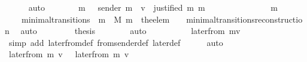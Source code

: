 \begin{isabellebody}
\ \ \ \ \isamarkupfalse%
\ auto\isanewline
\ \ \isamarkupfalse%
\ \isamarkupfalse%
\ {\isachardoublequoteopen}{\isasymdots}\ {\isacharequal}\ {\isacharbraceleft}m{\isacharprime}{\isacharprime}\ {\isasymin}\ {\isasymsigma}{\isacharprime}{\isachardot}\ sender\ m{\isacharprime}{\isacharprime}\ {\isacharequal}\ v\ {\isasymand}\ justified\ m\ m{\isacharprime}{\isacharprime}{\isacharbraceright}{\isachardoublequoteclose}\isanewline
\ \ \isamarkupfalse%
\ {\isacharminus}\isanewline
\ \ \ \ \isamarkupfalse%
\ {\isachardoublequoteopen}{\isasymsigma}{\isacharprime}\ {\isacharequal}\ \ {\isasymsigma}\ {\isasymunion}\ {\isacharbraceleft}m{\isacharprime}{\isacharbraceright}{\isachardoublequoteclose}\isanewline
\ \ \ \ \ \ \isamarkupfalse%
\ {\isacartoucheopen}{\isacharparenleft}{\isasymsigma}{\isacharcomma}\ {\isasymsigma}{\isacharprime}{\isacharparenright}\ {\isasymin}\ minimal{\isacharunderscore}transitions\ {\isasymand}\ m\ {\isasymin}\ M{\isacartoucheclose}\ {\isacartoucheopen}m{\isacharprime}\ {\isacharequal}\ the{\isacharunderscore}elem\ {\isacharparenleft}{\isasymsigma}{\isacharprime}\ {\isacharminus}\ {\isasymsigma}{\isacharparenright}{\isacartoucheclose}\ minimal{\isacharunderscore}transitions{\isacharunderscore}reconstruction\ \isamarkupfalse%
\ auto\ \isanewline
\ \ \ \ \isamarkupfalse%
\ \isamarkupfalse%
\ {\isacharquery}thesis\isanewline
\ \ \ \ \ \ \isamarkupfalse%
\ auto\isanewline
\ \ \isamarkupfalse%
\isanewline
\ \ \isamarkupfalse%
\ \isamarkupfalse%
\ {\isachardoublequoteopen}{\isasymdots}\ {\isacharequal}\ later{\isacharunderscore}from\ {\isacharparenleft}m{\isacharcomma}v{\isacharcomma}{\isasymsigma}{\isacharprime}{\isacharparenright}{\isachardoublequoteclose}\isanewline
\ \ \ \ \isamarkupfalse%
\ {\isacharparenleft}simp\ add{\isacharcolon}\ later{\isacharunderscore}from{\isacharunderscore}def\ from{\isacharunderscore}sender{\isacharunderscore}def\ later{\isacharunderscore}def{\isacharparenright}\isanewline
\ \ \ \ \isamarkupfalse%
\ auto\isanewline
\ \ \isamarkupfalse%
\ \isamarkupfalse%
\ {\isachardoublequoteopen}later{\isacharunderscore}from\ {\isacharparenleft}m{\isacharcomma}\ v{\isacharcomma}\ {\isasymsigma}{\isacharparenright}\ {\isacharequal}\ later{\isacharunderscore}from\ {\isacharparenleft}m{\isacharcomma}\ v{\isacharcomma}\ {\isasymsigma}{\isacharprime}{\isacharparenright}{\isachardoublequoteclose}\isanewline

\end{isabellebody}
